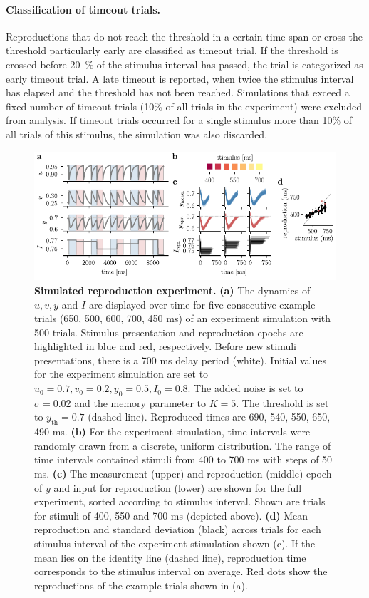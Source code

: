 \documentclass[10pt]{article}
\begin{document}
\paragraph{Classification of timeout trials.}
Reproductions that do not reach the threshold in a certain time span or cross the threshold particularly early are classified as timeout trial.
If the threshold is crossed before 20~\% of the stimulus interval has passed, the trial is categorized as early timeout trial.
A late timeout is reported, when twice the stimulus interval has elapsed and the threshold has not been reached.
Simulations that exceed a fixed number of timeout trials (10\% of all trials in the experiment) were excluded from analysis.
If timeout trials occurred for a single stimulus more than 10\% of all trials of this stimulus, the simulation was also discarded.

\begin{figure}[ht]
	\centering
	\includegraphics{figures/trial.pdf}
	\caption{\textbf{Simulated reproduction experiment.} 
	\textbf{(a)} The dynamics of $u, v, y $ and $I$ are displayed over time for five consecutive example trials (650, 500, 600, 700, 450 ms) of an experiment simulation with 500 trials. Stimulus presentation and reproduction epochs are highlighted in blue and red, respectively. Before new stimuli presentations, there is a 700 ms delay period (white). Initial values for the experiment simulation are set to $u_0=0.7, v_0=0.2, y_0=0.5, I_0=0.8$. The added noise is set to $\sigma=0.02$ and the memory parameter to $K=5$. The threshold is set to $y_{\text{th}}=0.7$ (dashed line). Reproduced times are 690, 540, 550, 650, 490 ms.
	\textbf{(b)} For the experiment simulation, time intervals were randomly drawn from a discrete, uniform distribution. The range of time intervals contained stimuli from 400 to 700 ms with steps of 50 ms.
	\textbf{(c)} The measurement (upper) and reproduction (middle) epoch of $y$ and input for reproduction (lower) are shown for the full experiment, sorted according to stimulus interval. Shown are trials for stimuli of 400, 550 and 700 ms (depicted above).
	\textbf{(d)} Mean reproduction and standard deviation (black) across trials for each stimulus interval of the experiment stimulation shown (c). If the mean lies on the identity line (dashed line), reproduction time corresponds to the stimulus interval on average. Red dots show the reproductions of the example trials shown in (a). 
	}
\label{fig:experiment}
\end{figure}
\end{document}
